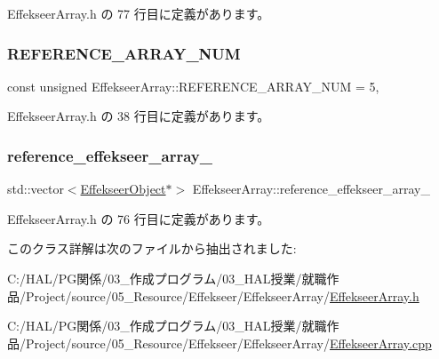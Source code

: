  Effekseer\+Array.\+h の 77 行目に定義があります。

\mbox{\label{class_effekseer_array_aa58d9c8f0e75d233f3bb2a92c3374bbb}} 
\subsubsection{\texorpdfstring{R\+E\+F\+E\+R\+E\+N\+C\+E\+\_\+\+A\+R\+R\+A\+Y\+\_\+\+N\+UM}{REFERENCE\_ARRAY\_NUM}}
{\footnotesize\ttfamily const unsigned Effekseer\+Array\+::\+R\+E\+F\+E\+R\+E\+N\+C\+E\+\_\+\+A\+R\+R\+A\+Y\+\_\+\+N\+UM = 5\hspace{0.3cm}{\ttfamily [static]}, {\ttfamily [private]}}



 Effekseer\+Array.\+h の 38 行目に定義があります。

\mbox{\label{class_effekseer_array_ab4fc19ba8c5a587817d9ac202c722f21}} 
\subsubsection{\texorpdfstring{reference\+\_\+effekseer\+\_\+array\+\_\+}{reference\_effekseer\_array\_}}
{\footnotesize\ttfamily std\+::vector$<$\mbox{\hyperlink{class_effekseer_object}{Effekseer\+Object}}$\ast$$>$ Effekseer\+Array\+::reference\+\_\+effekseer\+\_\+array\+\_\+\hspace{0.3cm}{\ttfamily [private]}}



 Effekseer\+Array.\+h の 76 行目に定義があります。



このクラス詳解は次のファイルから抽出されました\+:\begin{DoxyCompactItemize}
\item 
C\+:/\+H\+A\+L/\+P\+G関係/03\+\_\+作成プログラム/03\+\_\+\+H\+A\+L授業/就職作品/\+Project/source/05\+\_\+\+Resource/\+Effekseer/\+Effekseer\+Array/\mbox{\hyperlink{_effekseer_array_8h}{Effekseer\+Array.\+h}}\item 
C\+:/\+H\+A\+L/\+P\+G関係/03\+\_\+作成プログラム/03\+\_\+\+H\+A\+L授業/就職作品/\+Project/source/05\+\_\+\+Resource/\+Effekseer/\+Effekseer\+Array/\mbox{\hyperlink{_effekseer_array_8cpp}{Effekseer\+Array.\+cpp}}\end{DoxyCompactItemize}
